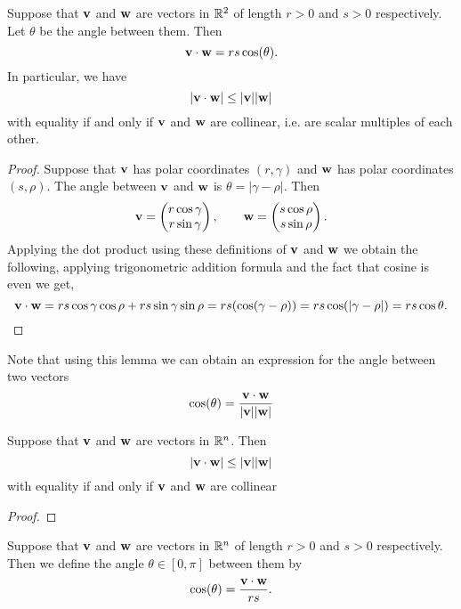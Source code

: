 \documentclass[10pt, a4paper]{article}
\begin{document}
\begin{lemma}
    Suppose that $\mathbf{v}$ and $\mathbf{w}$ are vectors in $\mathbb{R} ^ 2$ of length $r > 0 $ and $s > 0$ respectively. Let $\theta$ be the angle between them. Then
    \[
    \mathbf{v \cdot w} = rs\cos(\theta).
    \]
    In particular, we have
    \[
    |\mathbf{v \cdot w}| \leq |\mathbf{v}||\mathbf{w}|
    \]
    with equality if and only if $\mathbf{v}$ and $\mathbf{w}$ are collinear, i.e. are scalar multiples of each other.

    \begin{proof}
        Suppose that $\mathbf{v}$ has polar coordinates $(r, \gamma)$ and $\mathbf{w}$ has polar coordinates $(s, \rho)$. The angle between $\mathbf{v}$ and $\mathbf{w}$ is $\theta = |\gamma - \rho|$. Then
        \[
        \mathbf{v} = \begin{pmatrix}
            r\cos\gamma \\
            r\sin\gamma
        \end{pmatrix},
        \qquad
        \mathbf{w} = \begin{pmatrix}
            s\cos\rho \\
            s\sin\rho
        \end{pmatrix}.
        \]
        Applying the dot product using these definitions of $\mathbf{v}$ and $\mathbf{w}$ we obtain the following, applying trigonometric addition formula and the fact that cosine is even we get,
        \[
        \mathbf{v \cdot w} =  rs\cos\gamma\cos\rho + rs\sin\gamma\sin\rho = rs(\cos(\gamma - \rho)) = rs\cos(|\gamma - \rho|) = rs\cos\theta.
        \]
    \end{proof}
\end{lemma}
Note that using this lemma we can obtain an expression for the angle between two vectors
\[
\cos(\theta) = \frac{\mathbf{v \cdot w}}{|\mathbf{v}||\mathbf{w}|}
\]

\begin{theorem}
    Suppose that $\mathbf{v}$ and $\mathbf{w}$ are vectors in $\mathbb{R} ^ n$. Then
    \[
    |\mathbf{v \cdot w}| \leq |\mathbf{v}||\mathbf{w}|
    \]
    with equality if and only if $\mathbf{v}$ and $\mathbf{w}$ are collinear

    \begin{proof}
        
    \end{proof}
\end{theorem}

\begin{definition}\label{def_linalg_vec_angbetvecs}
    Suppose that $\mathbf{v}$ and $\mathbf{w}$ are vectors in $\mathbb{R} ^ n$ of length $r > 0$ and $s > 0$ respectively. Then we define the angle $\theta \in [0, \pi]$ between them by
    \[
    \cos(\theta) = \frac{\mathbf{v \cdot w}}{rs}.
    \]
\end{definition}
\end{document}
